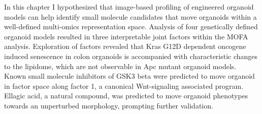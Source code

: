 \begin{flushleft}
\bigbreak
In this chapter I hypothesized that image-based profiling of engineered organoid models can help identify small molecule candidates that move organoids within a well-defined multi-omics representation space. Analysis of four genetically defined organoid models resulted in three interpretable joint factors within the MOFA analysis. Exploration of factors revealed that Kras G12D dependent oncogene induced senescence in colon organoids is accompanied with characteristic changes to the lipidome, which are not observable in Apc mutant organoid models. Known small molecule inhibitors of GSK3 beta were predicted to move organoid in factor space along factor 1, a canonical Wnt-signaling associated program. Ellagic acid, a natural compound, was predicted to move organoid phenotypes towards an unperturbed morphology, prompting further validation.
\end{flushleft}